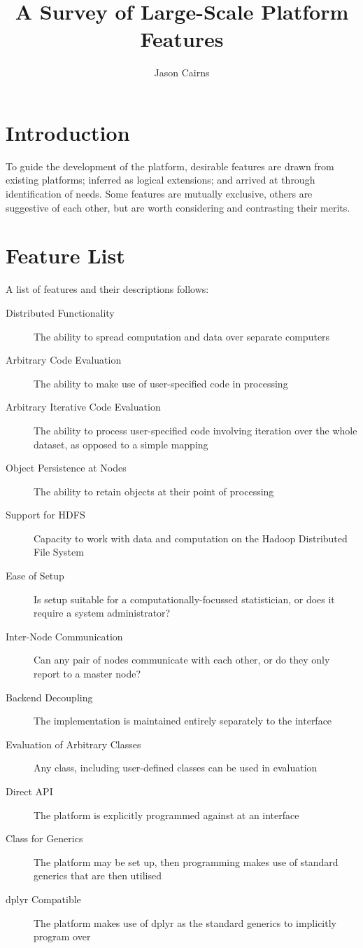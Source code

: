 \documentclass[a4paper,10pt]{article}
\begin{document}
\title{A Survey of Large-Scale Platform Features}
\author{Jason Cairns}
  
\maketitle

\section{Introduction}\label{sec:intro}

To guide the development of the platform, desirable features are drawn from
existing platforms; inferred as logical extensions; and arrived at through
identification of needs. Some features are mutually exclusive, others are
suggestive of each other, but are worth considering and contrasting their
merits.

\section{Feature List}\label{sec:feature-list}

A list of features and their descriptions follows:

\begin{description}
\item[Distributed Functionality] The ability to spread computation and data
over separate computers
\item[Arbitrary Code Evaluation] The ability to make use of user-specified code
in processing
\item[Arbitrary Iterative Code Evaluation] The ability to process
user-specified code involving iteration over the whole dataset, as opposed to a
simple mapping
\item[Object Persistence at Nodes] The ability to retain objects at their point
of processing
\item[Support for HDFS] Capacity to work with data and computation on the
Hadoop Distributed File System
\item[Ease of Setup] Is setup suitable for a computationally-focussed
statistician, or does it require a system administrator?
\item[Inter-Node Communication] Can any pair of nodes communicate with each
other, or do they only report to a master node? 
\item[Backend Decoupling] The implementation is maintained entirely separately
to the interface
\item[Evaluation of Arbitrary Classes] Any class, including user-defined
classes can be used in evaluation
\item[Direct API] The platform is explicitly programmed against at an interface
\item[Class for Generics] The platform may be set up, then programming makes
use of standard generics that are then utilised
\item[dplyr Compatible] The platform makes use of dplyr as the standard
generics to implicitly program over
\end{description}
\end{document}
